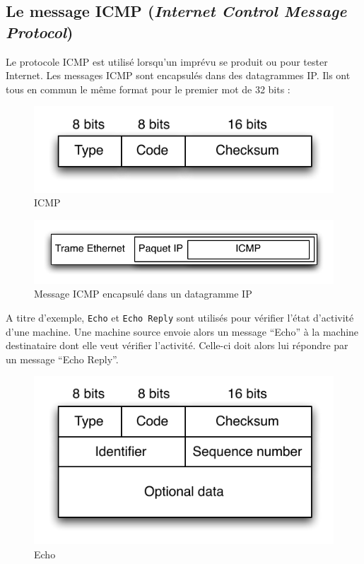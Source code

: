 \documentclass[11pt,english,french]{scrreprt}
\theoremstyle{remark}
\theoremstyle{definition}
\begin{document}
\subsection{Le message ICMP (\emph{Internet Control Message Protocol}) } %

Le protocole ICMP est utilisé lorsqu'un imprévu se produit ou pour tester Internet. Les messages ICMP sont encapsulés dans des datagrammes IP. Ils ont tous en commun le même format pour le premier mot de 32 bits :
\begin{figure}[h!]
	\center
	\includegraphics[scale=.75]{graphes/IP/ICMP}
	\caption{ICMP}
\end{figure}

\begin{figure}[h!]
	\center
	\includegraphics[scale=.75]{graphes/IP/Encapuslation_ICMP}
	\caption{Message ICMP encapsulé dans un datagramme IP}
\end{figure}

A titre d'exemple, \lstinline!Echo! et \lstinline!Echo Reply! sont utilisés pour vérifier l'état d'activité d'une machine. Une machine source envoie alors un message “Echo” à la machine destinataire dont elle veut vérifier l'activité. Celle-ci doit alors lui répondre par un message “Echo Reply”.
\begin{figure}[h!]
	\center
	\includegraphics[scale=.75]{graphes/IP/Echo}
	\caption{Echo}
\end{figure}
\end{document}
